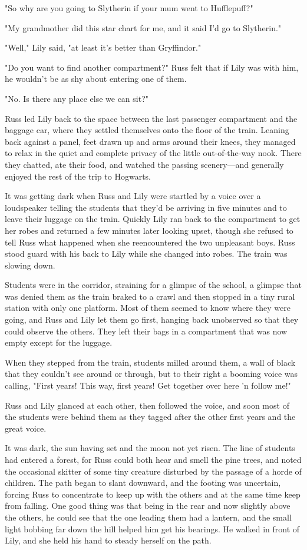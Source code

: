 "So why are you going to Slytherin if your mum went to Hufflepuff?"

"My grandmother did this star chart for me, and it{\el} said I'd go to Slytherin."

"Well," Lily said, "at least it's better than Gryffindor."

"Do you want to find another compartment?" Russ felt that if Lily was with him, he wouldn't be as shy about entering one of them.

"No. Is there any place else we can sit?"

Russ led Lily back to the space between the last passenger compartment and the baggage car, where they settled themselves onto the floor of the train. Leaning back against a panel, feet drawn up and arms around their knees, they managed to relax in the quiet and complete privacy of the little out-of-the-way nook. There they chatted, ate their food, and watched the passing scenery—and generally enjoyed the rest of the trip to Hogwarts.

It was getting dark when Russ and Lily were startled by a voice over a loudspeaker telling the students that they'd be arriving in five minutes and to leave their luggage on the train. Quickly Lily ran back to the compartment to get her robes and returned a few minutes later looking upset, though she refused to tell Russ what happened when she reencountered the two unpleasant boys. Russ stood guard with his back to Lily while she changed into robes. The train was slowing down.

Students were in the corridor, straining for a glimpse of the school, a glimpse that was denied them as the train braked to a crawl and then stopped in a tiny rural station with only one platform. Most of them seemed to know where they were going, and Russ and Lily let them go first, hanging back unobserved so that they could observe the others. They left their bags in a compartment that was now empty except for the luggage.

When they stepped from the train, students milled around them, a wall of black that they couldn't see around or through, but to their right a booming voice was calling, "First years! This way, first years! Get together over here 'n follow me!"

Russ and Lily glanced at each other, then followed the voice, and soon most of the students were behind them as they tagged after the other first years and the great voice.

It was dark, the sun having set and the moon not yet risen. The line of students had entered a forest, for Russ could both hear and smell the pine trees, and noted the occasional skitter of some tiny creature disturbed by the passage of a horde of children. The path began to slant downward, and the footing was uncertain, forcing Russ to concentrate to keep up with the others and at the same time keep from falling. One good thing was that being in the rear and now slightly above the others, he could see that the one leading them had a lantern, and the small light bobbing far down the hill helped him get his bearings. He walked in front of Lily, and she held his hand to steady herself on the path.

